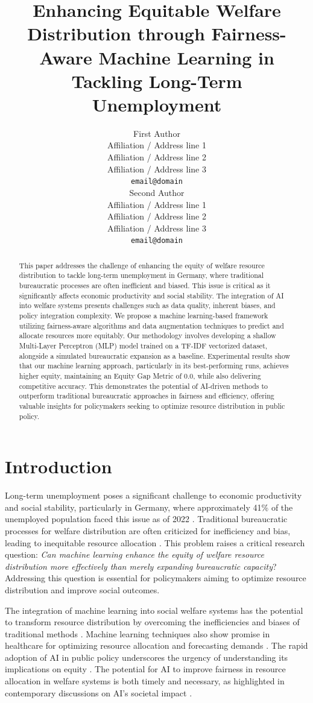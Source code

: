 \documentclass[11pt]{article}
\title{Enhancing Equitable Welfare Distribution through Fairness-Aware Machine Learning in Tackling Long-Term Unemployment}
\author{First Author \\
  Affiliation / Address line 1 \\
  Affiliation / Address line 2 \\
  Affiliation / Address line 3 \\
  \texttt{email@domain} \\\And
  Second Author \\
  Affiliation / Address line 1 \\
  Affiliation / Address line 2 \\
  Affiliation / Address line 3 \\
  \texttt{email@domain} \\}
\begin{document}
\maketitle
\begin{abstract}
This paper addresses the challenge of enhancing the equity of welfare resource distribution to tackle long-term unemployment in Germany, where traditional bureaucratic processes are often inefficient and biased. This issue is critical as it significantly affects economic productivity and social stability. The integration of AI into welfare systems presents challenges such as data quality, inherent biases, and policy integration complexity. We propose a machine learning-based framework utilizing fairness-aware algorithms and data augmentation techniques to predict and allocate resources more equitably. Our methodology involves developing a shallow Multi-Layer Perceptron (MLP) model trained on a TF-IDF vectorized dataset, alongside a simulated bureaucratic expansion as a baseline. Experimental results show that our machine learning approach, particularly in its best-performing runs, achieves higher equity, maintaining an Equity Gap Metric of 0.0, while also delivering competitive accuracy. This demonstrates the potential of AI-driven methods to outperform traditional bureaucratic approaches in fairness and efficiency, offering valuable insights for policymakers seeking to optimize resource distribution in public policy.
\end{abstract}


\section{Introduction}

Long-term unemployment poses a significant challenge to economic productivity and social stability, particularly in Germany, where approximately 41\% of the unemployed population faced this issue as of 2022 . Traditional bureaucratic processes for welfare distribution are often criticized for inefficiency and bias, leading to inequitable resource allocation \citep{active2019}. This problem raises a critical research question: \textit{Can machine learning enhance the equity of welfare resource distribution more effectively than merely expanding bureaucratic capacity}? Addressing this question is essential for policymakers aiming to optimize resource distribution and improve social outcomes.

The integration of machine learning into social welfare systems has the potential to transform resource distribution by overcoming the inefficiencies and biases of traditional methods \citep{healthcare2024,balancing2020,big2025}. Machine learning techniques also show promise in healthcare for optimizing resource allocation and forecasting demands \citep{forecasting2025,optimizing2024}. The rapid adoption of AI in public policy underscores the urgency of understanding its implications on equity \citep{designing2023,equitable2025}. The potential for AI to improve fairness in resource allocation in welfare systems is both timely and necessary, as highlighted in contemporary discussions on AI's societal impact \citep{ai2023,statistical2024}.
\end{document}
